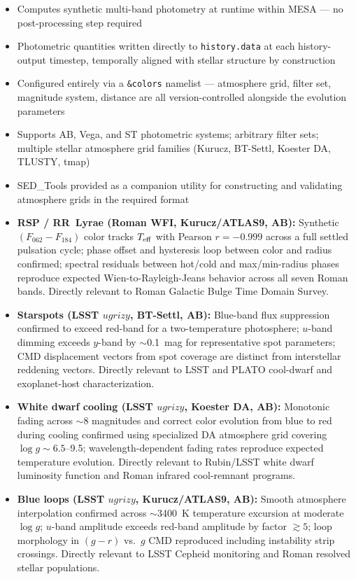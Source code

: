\documentclass[linenumbers,apj,twocolumn, floatfix]{aastex701} \usepackage{amsmath} \usepackage{longtable} \usepackage{graphicx} \usepackage{ulem} \usepackage{xcolor} \usepackage{lettrine} \usepackage{yfonts} \usepackage{rotating}
\begin{document}
\begin{itemize}
    \item Computes synthetic multi-band photometry at runtime within MESA — no post-processing step required
    \item Photometric quantities written directly to \texttt{history.data} at each history-output timestep, temporally aligned with stellar structure by construction
    \item Configured entirely via a \texttt{\&colors} namelist — atmosphere grid, filter set, magnitude system, distance are all version-controlled alongside the evolution parameters
    \item Supports AB, Vega, and ST photometric systems; arbitrary filter sets; multiple stellar atmosphere grid families (Kurucz, BT-Settl, Koester DA, TLUSTY, tmap)
    \item SED\_Tools provided as a companion utility for constructing and validating atmosphere grids in the required format
\end{itemize}

\begin{itemize}
    \item \textbf{RSP / RR~Lyrae (Roman WFI, Kurucz/ATLAS9, AB):} Synthetic $(F_{062}-F_{184})$ color tracks $T_{\rm eff}$ with Pearson $r = -0.999$ across a full settled pulsation cycle; phase offset and hysteresis loop between color and radius confirmed; spectral residuals between hot/cold and max/min-radius phases reproduce expected Wien-to-Rayleigh-Jeans behavior across all seven Roman bands. Directly relevant to Roman Galactic Bulge Time Domain Survey.
    \item \textbf{Starspots (LSST $ugrizy$, BT-Settl, AB):} Blue-band flux suppression confirmed to exceed red-band for a two-temperature photosphere; $u$-band dimming exceeds $y$-band by $\sim$0.1~mag for representative spot parameters; CMD displacement vectors from spot coverage are distinct from interstellar reddening vectors. Directly relevant to LSST and PLATO cool-dwarf and exoplanet-host characterization.
    \item \textbf{White dwarf cooling (LSST $ugrizy$, Koester DA, AB):} Monotonic fading across $\sim$8 magnitudes and correct color evolution from blue to red during cooling confirmed using specialized DA atmosphere grid covering $\log g \sim 6.5$--9.5; wavelength-dependent fading rates reproduce expected temperature evolution. Directly relevant to Rubin/LSST white dwarf luminosity function and Roman infrared cool-remnant programs.
    \item \textbf{Blue loops (LSST $ugrizy$, Kurucz/ATLAS9, AB):} Smooth atmosphere interpolation confirmed across $\sim$3400~K temperature excursion at moderate $\log g$; $u$-band amplitude exceeds red-band amplitude by factor $\gtrsim 5$; loop morphology in $(g-r)$ vs.\ $g$ CMD reproduced including instability strip crossings. Directly relevant to LSST Cepheid monitoring and Roman resolved stellar populations.
\end{itemize}
\end{document}
